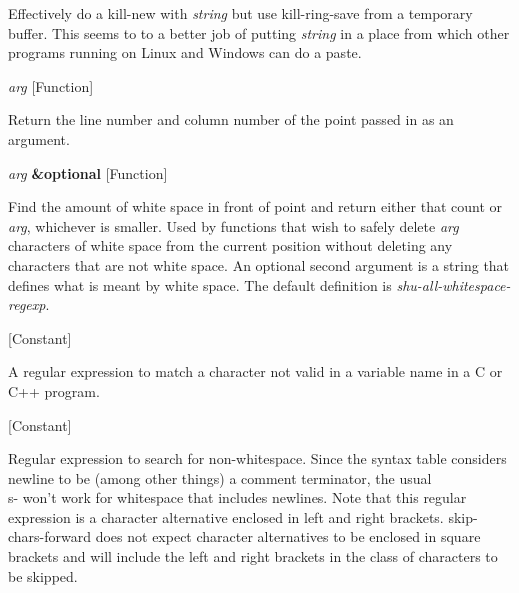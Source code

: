 \begin{doc-string}
Effectively do a kill-new with \emph{string} but use kill-ring-save from
a temporary buffer.  This seems to to a better job of putting \emph{string}
in a place from which other programs running on Linux and Windows can
do a paste.
\end{doc-string}

\vspace{1em}
\noindent
{}
\usebox{\funcname}\emph{arg}
 \hfill [Function]

\begin{doc-string}
Return the line number and column number of the point passed in as an argument.
\end{doc-string}

\vspace{1em}
\noindent
{}
\usebox{\funcname}\emph{arg} \textbf{\&optional}
 \hfill [Function]
\hspace*{\wd\funcname}

\begin{doc-string}
Find the amount of white space in front of point and return either that
count or \emph{arg}, whichever is smaller.  Used by functions that wish to
safely delete \emph{arg} characters of white space from the current position
without deleting any characters that are not white space.
An optional second argument is a string that defines what is meant
by white space.  The default definition is \emph{shu-all-whitespace-regexp}.
\end{doc-string}

\vspace{1em}
\noindent
{}
\usebox{\funcname}
 \hfill [Constant]

\begin{doc-string}
A regular expression to match a character not valid in a variable name
in a C or C++ program.
\end{doc-string}

\vspace{1em}
\noindent
{}
\usebox{\funcname}
 \hfill [Constant]

\begin{doc-string}
Regular expression to search for non-whitespace.  Since the syntax table considers
newline to be (among other things) a comment terminator, the usual \\s- won't work
for whitespace that includes newlines.  Note that this regular expression is a
character alternative enclosed in left and right brackets.  skip-chars-forward does
not expect character alternatives to be enclosed in square brackets and will include
the left and right brackets in the class of characters to be skipped.
\end{doc-string}

